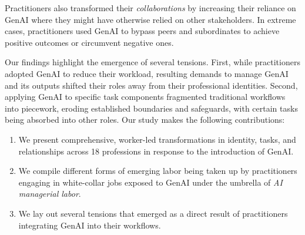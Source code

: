 Practitioners also transformed their \textit{collaborations} by increasing their reliance on GenAI where they might have otherwise relied on other stakeholders. In extreme cases, practitioners used GenAI to bypass peers and subordinates to achieve positive outcomes or circumvent negative ones. 

Our findings highlight the emergence of several tensions. First, while practitioners adopted GenAI to reduce their workload, resulting demands to manage GenAI and its outputs shifted their roles away from their professional identities. Second, applying GenAI to specific task components fragmented traditional workflows into piecework, eroding established boundaries and safeguards, with certain tasks being absorbed into other roles. Our study makes the following contributions:

\begin{enumerate}
    \item We present comprehensive, worker-led transformations in identity, tasks, and relationships across 18 professions in response to the introduction of GenAI.
    \item We compile different forms of emerging labor being taken up by practitioners engaging in white-collar jobs exposed to GenAI under the umbrella of \textit{AI managerial labor}. 
    \item We lay out several tensions that emerged as a direct result of practitioners integrating GenAI into their workflows. 
\end{enumerate}

